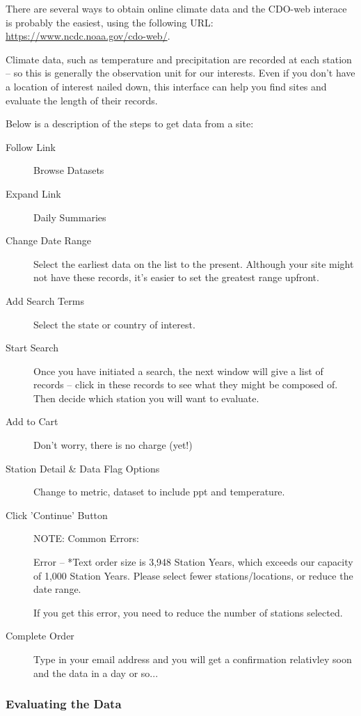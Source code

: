 \documentclass{article}\usepackage[]{graphicx}\usepackage[]{color}
\begin{document}
There are several ways to obtain online climate data and the CDO-web interace is probably the easiest, using the following URL: \url{https://www.ncdc.noaa.gov/cdo-web/}. 

Climate data, such as temperature and precipitation are recorded at each station -- so this is generally the observation unit for our interests. Even if you don't have a location of interest nailed down, this interface can help you find sites and evaluate the length of their records. 

Below is a description of the steps to get data from a site:

\begin{description}
  \item[Follow Link] Browse Datasets
  \item[Expand Link] Daily Summaries
  \item[Change Date Range] Select the earliest data on the list to the present. Although your site might not have these records, it's easier to set the greatest range upfront.
  \item[Add Search Terms] Select the state or country of interest.
  \item[Start Search] Once you have initiated a search, the next window will give a list of records -- click in these records to see what they might be composed of. Then decide which station you will want to evaluate.
  \item[Add to Cart] Don't worry, there is no charge (yet!)
  \item[Station Detail \& Data Flag Options] Change to metric, dataset to include ppt and temperature.
  \item[Click 'Continue' Button]
  
  NOTE: Common Errors:
  
Error -- *Text order size is 3,948 Station Years, which exceeds our capacity of 1,000 Station Years. Please select fewer stations/locations, or reduce the date range.

If you get this error, you need to reduce the number of stations selected.
  
  \item[Complete Order] Type in your email address and you will get a confirmation relativley soon and the data in a day or so...
\end{description}


\subsubsection{Evaluating the Data}
\end{document}
